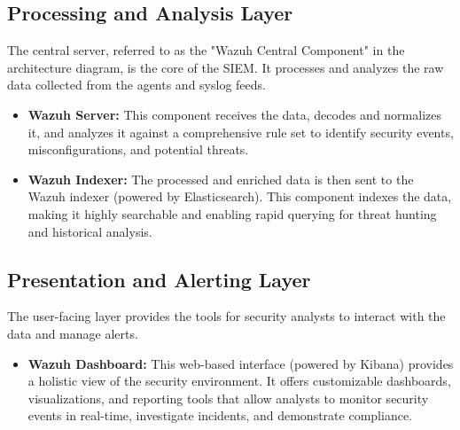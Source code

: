 \subsection{Processing and Analysis Layer}
The central server, referred to as the "Wazuh Central Component" in the architecture diagram, is the core of the SIEM. It processes and analyzes the raw data collected from the agents and syslog feeds.
\begin{itemize}
    \item \textbf{Wazuh Server:} This component receives the data, decodes and normalizes it, and analyzes it against a comprehensive rule set to identify security events, misconfigurations, and potential threats.
    \item \textbf{Wazuh Indexer:} The processed and enriched data is then sent to the Wazuh indexer (powered by Elasticsearch). This component indexes the data, making it highly searchable and enabling rapid querying for threat hunting and historical analysis.
\end{itemize}

\subsection{Presentation and Alerting Layer}
The user-facing layer provides the tools for security analysts to interact with the data and manage alerts.
\begin{itemize}
    \item \textbf{Wazuh Dashboard:} This web-based interface (powered by Kibana) provides a holistic view of the security environment. It offers customizable dashboards, visualizations, and reporting tools that allow analysts to monitor security events in real-time, investigate incidents, and demonstrate compliance.
\end{itemize}

